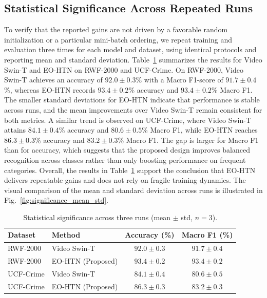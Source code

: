 \documentclass[AMA,Times1COL]{WileyNJDv5} %
\begin{document}
\subsection{Statistical Significance Across Repeated Runs}
To verify that the reported gains are not driven by a favorable random initialization or a particular mini-batch ordering, we repeat training and evaluation three times for each model and dataset, using identical protocols and reporting mean and standard deviation. Table~\ref{tab:stats_significance} summarizes the results for Video Swin-T and EO-HTN on RWF-2000 and UCF-Crime. On RWF-2000, Video Swin-T achieves an accuracy of $92.0 \pm 0.3$\% with a Macro F1-score of $91.7 \pm 0.4$\%, whereas EO-HTN records $93.4 \pm 0.2$\% accuracy and $93.4 \pm 0.2$\% Macro F1. The smaller standard deviations for EO-HTN indicate that performance is stable across runs, and the mean improvements over Video Swin-T remain consistent for both metrics. A similar trend is observed on UCF-Crime, where Video Swin-T attains $84.1 \pm 0.4$\% accuracy and $80.6 \pm 0.5$\% Macro F1, while EO-HTN reaches $86.3 \pm 0.3$\% accuracy and $83.2 \pm 0.3$\% Macro F1. The gap is larger for Macro F1 than for accuracy, which suggests that the proposed design improves balanced recognition across classes rather than only boosting performance on frequent categories. Overall, the results in Table~\ref{tab:stats_significance} support the conclusion that EO-HTN delivers repeatable gains and does not rely on fragile training dynamics. The visual comparison of the mean and standard deviation across runs is illustrated in Fig.~\ref{fig:significance_mean_std}.


\begin{table}[t]
\centering
\caption{Statistical significance across three runs (mean $\pm$ std, $n=3$).}
\label{tab:stats_significance}
\renewcommand{\arraystretch}{1.1}
\setlength{\tabcolsep}{3.8pt}
\begin{tabular}{|p{2.6cm}|p{3.6cm}|c|c|}
\hline
\textbf{Dataset} & \textbf{Method} & \textbf{Accuracy (\%)} & \textbf{Macro F1 (\%)} \\
\hline
RWF-2000 & Video Swin-T & $92.0 \pm 0.3$ & $91.7 \pm 0.4$ \\
\hline
RWF-2000 & EO-HTN (Proposed) & $\mathbf{93.4 \pm 0.2}$ & $\mathbf{93.4 \pm 0.2}$ \\
\hline
UCF-Crime & Video Swin-T & $84.1 \pm 0.4$ & $80.6 \pm 0.5$ \\
\hline
UCF-Crime & EO-HTN (Proposed) & $\mathbf{86.3 \pm 0.3}$ & $\mathbf{83.2 \pm 0.3}$ \\
\hline
\end{tabular}%
\end{table}
\end{document}
